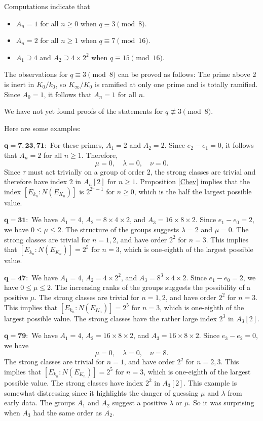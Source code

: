 \documentclass{amsart}
\begin{document}
Computations indicate that 
\begin{itemize}
\item $A_n=1$ for all $n\ge 0$  when $q\equiv 3\pmod 8$.
\item $A_n=2$ for all $n\ge 1$ when $q\equiv 7\pmod {16}$.
\item $A_1\supseteq 4$ and $A_2\supseteq 4\times 2^2$ when $q\equiv 15\pmod{16}$.
\end{itemize}
The observations for $q\equiv 3\pmod 8$ can be proved as follows: The prime above 2 is inert in $K_0/k_0$, so $K_{\infty}/K_0$ is ramified at only one prime and is totally ramified.
Since $A_0=1$, it follows that $A_n=1$ for all $n$.

We have not yet found proofs of the statements for $q\not\equiv 3\pmod 8$.

Here are some examples:

\noindent
$\mathbf{q=7, 23, 71:}$ For these primes, $A_1=2$ and $A_2=2$. Since $e_2-e_1=0$, it follows that $A_n=2$ for all $n\ge 1$.
Therefore,
$$
\mu=0, \quad \lambda =0, \quad \nu=0.
$$
 Since $\tau$ must act trivially on a group of order 2,
 the strong classes are trivial and therefore have index
$2$ in $A_n[2]$ for $n\ge 1$. Proposition \ref{Chev} implies that the index $[E_{k_n} : N(E_{K_n})]$ is $2^{2^n-1}$ for $n\ge 0$, 
which is the half the largest possible value.  


\medskip
\noindent
$\mathbf{q=31:}$ We have $A_1=4$, $A_2=8\times 4\times 2$, and $A_3=16\times 8\times 2$. Since $e_1-e_0=2$, we have $0\le \mu\le 2$. 
The structure of the groups suggests
$\lambda =2$ and $\mu=0$. The strong classes are trivial for $n=1, 2$, 
and have order $2^2$ for $n=3$. This implies that $[E_{k_n} : N(E_{K_n})]=2^5$ for $n=3$, which is one-eighth of the largest possible value.

\medskip
\noindent
$\mathbf{q=47:}$ We have $A_1=4$, $A_2=4\times 2^2$, and $A_3= 8^3\times 4\times 2$. Since $e_1-e_0=2$, we have $0\le \mu\le 2$. 
The increasing ranks of the groups suggests the possibility of a positive $\mu$.
 The strong classes are trivial for $n=1, 2$, and have order $2^2$ for $n=3$. This implies 
that $[E_{k_n} : N(E_{K_n})]=2^5$ for $n=3$, which is one-eighth of the largest possible value. The strong classes have the rather large index
$2^3$ in $A_3[2]$. 

\medskip
\noindent
$\mathbf{q=79:}$ We have $A_1=4$, $A_2=16\times 8\times 2$, and $A_3= 16\times 8\times 2$. Since $e_3-e_2=0$, we have 
$$
\mu=0, \quad \lambda =0, \quad \nu=8.
$$
 The strong classes are trivial for $n=1$, and have order $2^2$ for $n=2, 3$. This implies that $[E_{k_n} : N(E_{K_n})]=2^5$ for $n=3$, 
which is one-eighth of the largest possible value. The strong classes have index
$2^2$ in $A_3[2]$. This example is somewhat distressing since it highlights the danger of 
guessing $\mu$ and $\lambda$ from early data. The groups $A_1$ and $A_2$ suggest a positive $\lambda$ or $\mu$.
So it was surprising when $A_3$ had the same order as $A_2$.
\end{document}
